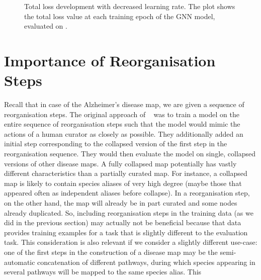 \documentclass[
	fontsize=10pt, %
	twoside=true, %
	secnumdepth=1, %
  toc=indentunnumbered %
]{kaobook}
\begin{document}
\begin{figure}[h]
  \centering
  \begin{subfigure}[h]{0.49\linewidth}
  \end{subfigure}
  \caption{Total loss development with decreased learning rate. The plot shows
    the total loss value at each training epoch of the GNN model, evaluated on
    \ReconMap{}.}
  \label{fig:svm-repro-lowlr-reconmapolder-loss}
\end{figure}


\section{Importance of Reorganisation Steps}
\label{sec:importance-reorganisation-steps}
Recall that in case of the Alzheimer's disease map, we are given a sequence of
reorganisation steps. The original approach of
\nielsen{}~\cite{nielsen_MachineLearningSupport_2019} was to train a model on
the entire sequence of reorganisation steps such that the model would mimic the
actions of a human curator as closely as possible. They additionally added an
initial step corresponding to the collapsed version of the first step in the
reorganisation sequence. They would then evaluate the model on single, collapsed
versions of other disease maps.
%
A fully collapsed map potentially has vastly different characteristics than a
partially curated map. For instance, a collapsed map is likely to contain
species aliases of very high degree (maybe those that appeared often as
independent aliases before collapse). In a reorganisation step, on the other
hand, the map will already be in part curated and some nodes already duplicated.
%
So, including reorganisation steps in the training data (as we did in the
previous section) may actually not be beneficial because that data provides
training examples for a task that is slightly different to the evaluation task.
%
This consideration is also relevant if we consider a slightly different
use-case: one of the first steps in the construction of a disease map may be the
semi-automatic concatenation of different pathways, during which species
appearing in several pathways will be mapped to the same species alias. This
\end{document}

